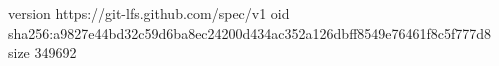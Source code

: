 version https://git-lfs.github.com/spec/v1
oid sha256:a9827e44bd32c59d6ba8ec24200d434ac352a126dbff8549e76461f8c5f777d8
size 349692
